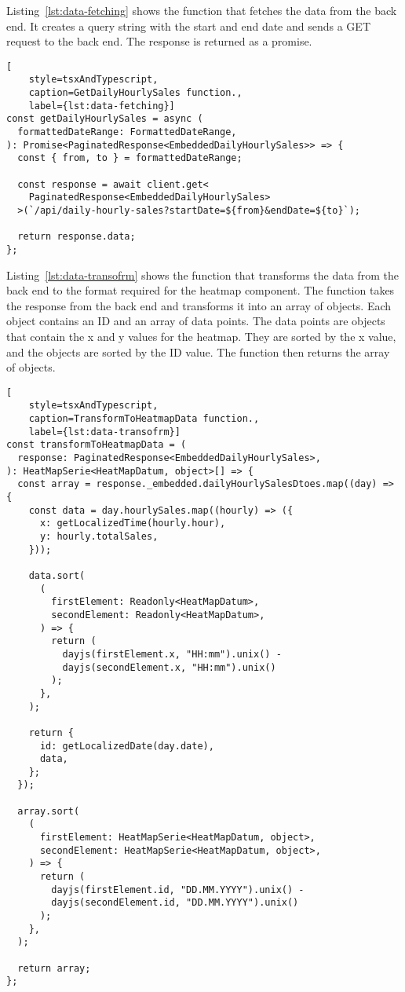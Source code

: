Listing~\ref{lst:data-fetching} shows the function that fetches the data from the back end.
It creates a query string with the start and end date and sends a GET request to the back end.
The response is returned as a promise.

\begin{lstlisting}[
    style=tsxAndTypescript,
    caption=GetDailyHourlySales function.,
    label={lst:data-fetching}]
const getDailyHourlySales = async (
  formattedDateRange: FormattedDateRange,
): Promise<PaginatedResponse<EmbeddedDailyHourlySales>> => {
  const { from, to } = formattedDateRange;

  const response = await client.get<
    PaginatedResponse<EmbeddedDailyHourlySales>
  >(`/api/daily-hourly-sales?startDate=${from}&endDate=${to}`);

  return response.data;
};
\end{lstlisting}

Listing~\ref{lst:data-transofrm} shows the function that transforms the data from the back end to the format required
for the heatmap component.
The function takes the response from the back end and transforms it into an array of objects.
Each object contains an ID and an array of data points.
The data points are objects that contain the x and y values for the heatmap.
They are sorted by the x value, and the objects are sorted by the ID value.
The function then returns the array of objects.

\begin{lstlisting}[
    style=tsxAndTypescript,
    caption=TransformToHeatmapData function.,
    label={lst:data-transofrm}]
const transformToHeatmapData = (
  response: PaginatedResponse<EmbeddedDailyHourlySales>,
): HeatMapSerie<HeatMapDatum, object>[] => {
  const array = response._embedded.dailyHourlySalesDtoes.map((day) => {
    const data = day.hourlySales.map((hourly) => ({
      x: getLocalizedTime(hourly.hour),
      y: hourly.totalSales,
    }));

    data.sort(
      (
        firstElement: Readonly<HeatMapDatum>,
        secondElement: Readonly<HeatMapDatum>,
      ) => {
        return (
          dayjs(firstElement.x, "HH:mm").unix() -
          dayjs(secondElement.x, "HH:mm").unix()
        );
      },
    );

    return {
      id: getLocalizedDate(day.date),
      data,
    };
  });

  array.sort(
    (
      firstElement: HeatMapSerie<HeatMapDatum, object>,
      secondElement: HeatMapSerie<HeatMapDatum, object>,
    ) => {
      return (
        dayjs(firstElement.id, "DD.MM.YYYY").unix() -
        dayjs(secondElement.id, "DD.MM.YYYY").unix()
      );
    },
  );

  return array;
};
\end{lstlisting}
